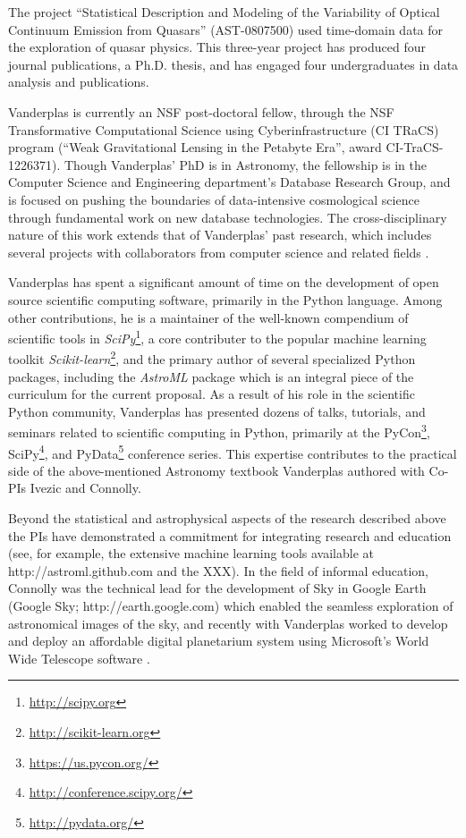 The project ``Statistical Description and Modeling of the Variability
of Optical Continuum Emission from Quasars'' (AST-0807500) used
time-domain data for the exploration of quasar physics. This
three-year project has produced four journal publications, a
Ph.D. thesis, and has engaged four undergraduates in data analysis and
publications.

Vanderplas is currently an NSF post-doctoral fellow, through the NSF
Transformative Computational Science using Cyberinfrastructure (CI TRaCS)
program (``Weak Gravitational Lensing in the Petabyte Era'', award
CI-TraCS-1226371).
Though Vanderplas' PhD is in Astronomy, the fellowship is in the Computer
Science and Engineering department's Database Research Group, and is focused
on pushing the boundaries of data-intensive cosmological science through
fundamental work on new database technologies. The cross-disciplinary nature
of this work extends that of Vanderplas' past research, which includes several
projects with collaborators from computer science and related fields
\cite{Daniel2011, Xiong2011, scikit-learn1, scikit-learn2}.

Vanderplas has spent a significant amount of time on the development of
open source scientific computing software, primarily in the Python
language.  Among other contributions,
he is a maintainer of the well-known compendium of scientific tools in
{\it SciPy}\footnote{\url{http://scipy.org}}, a core contributer to the
popular machine learning toolkit
{\it Scikit-learn}\footnote{\url{http://scikit-learn.org}},
and the primary author of several specialized Python packages,
including the {\it AstroML} package which is an integral piece of the
curriculum for the current proposal.
As a result of his role in the scientific Python community, Vanderplas
has presented dozens of talks, tutorials, and seminars related to scientific
computing in Python, primarily at the
PyCon\footnote{\url{https://us.pycon.org/}},
SciPy\footnote{\url{http://conference.scipy.org/}},
and PyData\footnote{\url{http://pydata.org/}} conference series.
This expertise contributes to the practical side of the above-mentioned
Astronomy textbook Vanderplas authored with Co-PIs Ivezic and Connolly.

Beyond the statistical and astrophysical aspects of the research
described above the PIs have demonstrated a commitment for integrating
research and education (see, for example, the extensive machine
learning tools available at http://astroml.github.com and the XXX). In
the field of informal education, Connolly was the technical lead for
the development of Sky in Google Earth (Google Sky;
http://earth.google.com) which enabled the seamless exploration of
astronomical images of the sky, and recently with Vanderplas worked to
develop and deploy an affordable digital planetarium system using Microsoft's
World Wide Telescope software \cite{rosenfield2011}.

